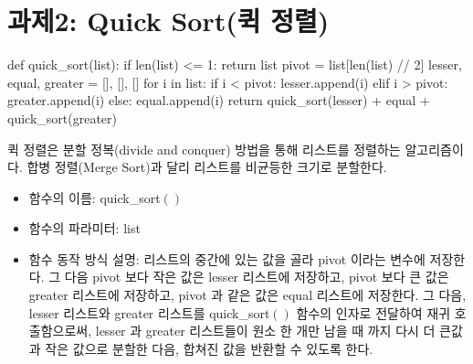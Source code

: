 \documentclass{article}
\begin{document}
\section{과제2: Quick Sort(퀵 정렬)}
\begin{python}
	def quick_sort(list):
		if len(list) <= 1:
			return list
		pivot = list[len(list) // 2]
		lesser, equal, greater = [], [], []
		for i in list:
			if i < pivot:
				lesser.append(i)
			elif i > pivot:
				greater.append(i)
			else:
				equal.append(i)
		return quick_sort(lesser) + equal + quick_sort(greater)
\end{python}
퀵 정렬은 분할 정복(divide and conquer) 방법을 통해 리스트를 정렬하는 알고리즘이다.
합병 정렬(Merge Sort)과 달리 리스트를 비균등한 크기로 분할한다.
	\begin{itemize}
		\item 함수의 이름: quick\_sort$()$
		\item 함수의 파라미터: list
		\item 함수 동작 방식 설명: 리스트의 중간에 있는 값을 골라 pivot 이라는 변수에
		저장한다. 그 다음 pivot 보다 작은 값은 lesser 리스트에 저장하고, pivot 보다
		큰 값은 greater 리스트에 저장하고, pivot 과 같은 값은 equal 리스트에 저장한다.
		그 다음, lesser 리스트와 greater 리스트를 quick\_sort$()$ 함수의 인자로
		전달하여 재귀 호출함으로써, lesser 과 greater 리스트들이 원소 한 개만 남을 때
		까지 다시 더 큰값과 작은 값으로 분할한 다음, 합쳐진 값을 반환할 수 있도록 한다.
	\end{itemize}
\end{document}
